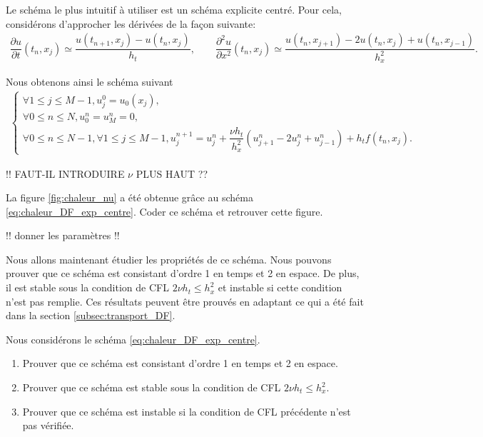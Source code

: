 \documentclass[12pt,a4paper,twoside]{article}
\begin{document}
Le sch\'ema le plus intuitif \`a utiliser est un sch\'ema 
explicite centr\'e.
Pour cela, consid\'erons d'approcher les d\'eriv\'ees de la fa\c{c}on suivante:
\begin{align*}
  \dfrac{\partial u}{\partial t}(t_n,x_j) \simeq \dfrac{u(t_{n+1},x_j) - u(t_n,x_j)}{h_t} ,
  \qquad 
  \dfrac{\partial^2 u}{\partial x^2}(t_n,x_j) 
  \simeq \dfrac{u(t_{n},x_{j+1}) - 2 u(t_n,x_j) + u(t_n,x_{j-1})}{h_x^2} .
\end{align*}


Nous obtenons ainsi le sch\'ema suivant
\begin{align}
  \label{eq:chaleur_DF_exp_centre}
  \left\{
  \begin{array}{l}
    \forall 1 \leq j \leq M-1 , 
    u_j^0 = u_0(x_j) ,
    \\
    \forall 0 \leq n \leq N, u_0^n = u_M^n = 0 ,
    \\
    \forall 0 \leq n \leq N-1, \forall 1 \leq j \leq M-1,
    u_j^{n+1} = u_j^{n} + \dfrac{\nu h_t}{h_x^2} (u_{j+1}^{n} - 2 u_{j}^{n} + u_{j-1}^{n} ) 
    + h_t f(t_n,x_j) .
  \end{array}
  \right.
\end{align}

!! FAUT-IL INTRODUIRE $\nu$ PLUS HAUT ??


\begin{exercise}
  La figure \ref{fig:chaleur_nu} 
  a \'et\'e obtenue gr\^ace au sch\'ema \eqref{eq:chaleur_DF_exp_centre}.
  Coder ce sch\'ema et retrouver cette figure.
  
  !! donner les param\`etres !!
\end{exercise}


Nous allons maintenant \'etudier les propri\'et\'es de ce sch\'ema.
Nous pouvons prouver que ce sch\'ema est consistant d'ordre 1 en temps et 2 en espace.
De plus, il est stable sous la condition de CFL $2 \nu h_t \leq h_x^2$ 
et instable si cette condition n'est
pas remplie.
Ces r\'esultats peuvent \^etre prouv\'es en adaptant ce qui a \'et\'e fait dans
la section \ref{subsec:transport_DF}.

\begin{exercise}
  Nous consid\'erons le sch\'ema \eqref{eq:chaleur_DF_exp_centre}.
  \begin{enumerate}
  \item Prouver que ce sch\'ema est consistant d'ordre 1 en temps et 2 en espace.
  \item Prouver que ce sch\'ema est stable sous la condition de CFL
    $2 \nu h_t \leq h_x^2$.
  \item Prouver que ce sch\'ema est instable si la condition de CFL
    pr\'ec\'edente n'est pas v\'erifi\'ee.
  \end{enumerate}
\end{exercise}
\end{document}
